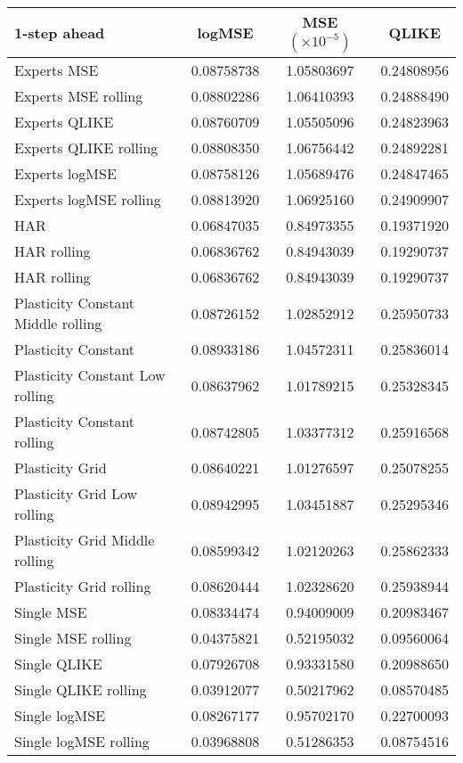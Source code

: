 
\begin{tabular}{l|c|c|c}
1-step ahead     & logMSE & MSE $(\times 10^{-5})$ & QLIKE \\\hline
Experts MSE & 0.08758738 & 1.05803697 & 0.24808956\\ 
Experts MSE rolling & 0.08802286 & 1.06410393 & 0.24888490\\ 
Experts QLIKE & 0.08760709 & 1.05505096 & 0.24823963\\ 
Experts QLIKE rolling & 0.08808350 & 1.06756442 & 0.24892281\\ 
Experts logMSE & 0.08758126 & 1.05689476 & 0.24847465\\ 
Experts logMSE rolling & 0.08813920 & 1.06925160 & 0.24909907\\ 
HAR & 0.06847035 & 0.84973355 & 0.19371920\\ 
HAR rolling & 0.06836762 & 0.84943039 & 0.19290737\\ 
HAR rolling & 0.06836762 & 0.84943039 & 0.19290737\\ 
Plasticity Constant Middle rolling & 0.08726152 & 1.02852912 & 0.25950733\\ 
Plasticity Constant & 0.08933186 & 1.04572311 & 0.25836014\\ 
Plasticity Constant Low rolling & 0.08637962 & 1.01789215 & 0.25328345\\ 
Plasticity Constant rolling & 0.08742805 & 1.03377312 & 0.25916568\\ 
Plasticity Grid & 0.08640221 & 1.01276597 & 0.25078255\\ 
Plasticity Grid Low rolling & 0.08942995 & 1.03451887 & 0.25295346\\ 
Plasticity Grid Middle rolling & 0.08599342 & 1.02120263 & 0.25862333\\ 
Plasticity Grid rolling & 0.08620444 & 1.02328620 & 0.25938944\\ 
Single MSE & 0.08334474 & 0.94009009 & 0.20983467\\ 
Single MSE rolling & 0.04375821 & 0.52195032 & 0.09560064\\ 
Single QLIKE & 0.07926708 & 0.93331580 & 0.20988650\\ 
Single QLIKE rolling & 0.03912077 & 0.50217962 & 0.08570485\\ 
Single logMSE & 0.08267177 & 0.95702170 & 0.22700093\\ 
Single logMSE rolling & 0.03968808 & 0.51286353 & 0.08754516\\ 
\end{tabular}